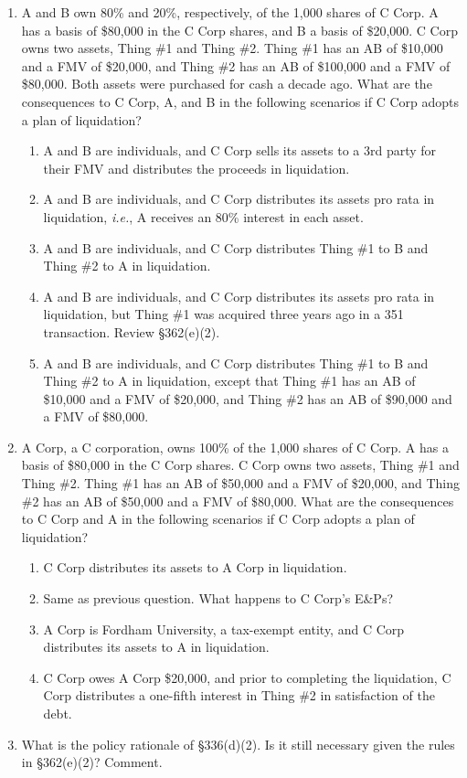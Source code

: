 \documentclass[12pt]{article}
\begin{document}
\begin{enumerate}
	\item	
		A and B own 80\% and 20\%, respectively, of the 1,000 shares of C Corp.  A has a basis of \$80,000 in the C Corp shares, and B a basis of \$20,000.  C Corp owns two assets, Thing \#1 and Thing \#2.  Thing \#1 has an AB of \$10,000 and a FMV of \$20,000, and Thing \#2 has an AB of \$100,000 and a FMV of \$80,000. Both assets were purchased for cash a decade ago.  What are the consequences to C Corp, A, and B in the following scenarios if C Corp adopts a plan of liquidation?    
	
		\begin{enumerate}	
				\item A and B are individuals, and C Corp sells its assets to a 3rd party for their FMV and distributes the proceeds in liquidation.
				\item A and B are individuals, and C Corp distributes its assets pro rata in liquidation, \emph{i.e.}, A receives an 80\% interest in each asset.
				\item A and B are individuals, and C Corp distributes Thing \#1 to B and Thing \#2 to A in liquidation.
				\item A and B are individuals, and C Corp distributes its assets pro rata in liquidation, but Thing \#1 was acquired three years ago in a 351 transaction.  Review \S362(e)(2).
				\item A and B are individuals, and C Corp distributes Thing \#1 to B and Thing \#2 to A in liquidation, except that Thing \#1 has an AB of \$10,000 and a FMV of \$20,000, and Thing \#2 has an AB of \$90,000 and a FMV of \$80,000.
		
			
		\end{enumerate}
	
	\item	
			A Corp, a C corporation, owns 100\% of the 1,000 shares of C Corp.  A has a basis of \$80,000 in the C Corp shares.  C Corp owns two assets, Thing \#1 and Thing \#2.  Thing \#1 has an AB of \$50,000 and a FMV of \$20,000, and Thing \#2 has an AB of \$50,000 and a FMV of \$80,000. What are the consequences to C Corp and A in the following scenarios if C Corp adopts a plan of liquidation?   
	
			\begin{enumerate}	
						\item C Corp distributes its assets to A Corp in liquidation.  
						\item Same as previous question. What happens to C Corp's E\&Ps?
						\item A Corp is Fordham University, a tax-exempt entity, and C Corp distributes its assets to A in liquidation.
						\item C Corp owes A Corp \$20,000, and prior to completing the liquidation, C Corp distributes a one-fifth interest in Thing \#2 in satisfaction of the debt.

					
				\end{enumerate}
	
	\item What is the policy rationale of \S336(d)(2).  Is it still necessary given the rules in \S362(e)(2)?  Comment.
	
	\end{enumerate}
	
	






	
\end{document}
